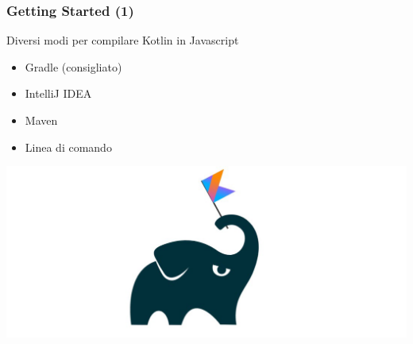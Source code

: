     \begin{frame}
      \frametitle{Getting Started (1)}
      \begin{block}{Diversi modi per compilare Kotlin in Javascript}
        \begin{itemize}[<+->]
          \item \alert{Gradle} (consigliato)
          \item IntelliJ IDEA
          \item Maven
          \item Linea di comando
        \end{itemize}
      \end{block}
      \begin{center}
        \includegraphics[scale=0.2]{KtGradle}
      \end{center}
    \end{frame}

